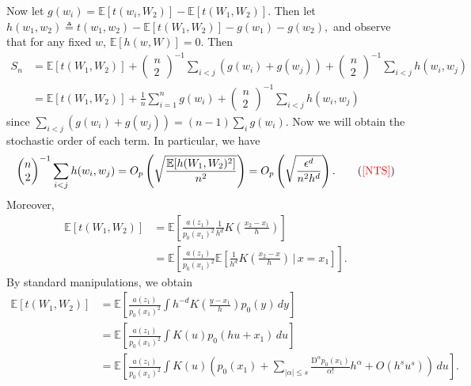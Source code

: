 \documentclass[11pt]{article}
\newcommand{\nts}{{\color{red}[NTS]}}
\begin{document}
Now let $g(w_i) = \mathbb{E}[t(w_i, W_2)] - \mathbb{E}[t(W_1, W_2)]$. Then let $h(w_1, w_2) \triangleq t(w_1, w_2) - \mathbb{E}[t(W_1, W_2)] - g(w_1) - g(w_2), $ and observe that for any fixed $w$, $\mathbb{E}[h(w, W)] = 0.$ Then
\begin{align*}
    S_n &=  \mathbb{E}[t(W_1, W_2)] + \begin{pmatrix}
        n \\
        2
    \end{pmatrix}^{-1}\sum_{i < j} (g(w_i) + g(w_j)) + \begin{pmatrix}
        n \\
        2
    \end{pmatrix}^{-1}\sum_{i < j}h(w_i, w_j) \\
    &= \mathbb{E}[t(W_1, W_2)] + \frac{1}{n}\sum_{i = 1}^n g(w_i) + \begin{pmatrix}
        n \\
        2
    \end{pmatrix}^{-1}\sum_{i < j}h(w_i, w_j)
\end{align*}
since $\sum_{i < j} (g(w_i) + g(w_j)) = (n-1)\sum_{i}g(w_i)$. Now we will obtain the stochastic order of each term. In particular, we have 
\begin{align*}
    \begin{pmatrix}
        n \\
        2
    \end{pmatrix}^{-1}\sum_{i < j}h(w_i, w_j) &= O_p\left(\sqrt{\frac{\mathbb{E}[h(W_1, W_2)^2]}{n^2}}\right) = O_p\left(\sqrt{\frac{\epsilon^d}{n^2h^d}}\right). \tag{\nts} \\
\end{align*}
Moreover,
\begin{align*}
    \mathbb{E}[t(W_1, W_2)] &= \mathbb{E}\left[\frac{a(z_1)}{p_0(x_1)^2}\frac{1}{h^d}K\left(\frac{x_2 - x_1}{h}\right)\right] \\
    &= \mathbb{E}\left[\frac{a(z_1)}{p_0(x_1)^2}\mathbb{E}\left[\frac{1}{h^d}K\left(\frac{x_2 - x}{h}\right)\,\Bigg|\, x = x_1\right]\right].
\end{align*}
By standard manipulations, we obtain 
\begin{align*}
    \mathbb{E}[t(W_1, W_2)] &= \mathbb{E}\left[\frac{a(z_1)}{p_0(x_1)^2}\int h^{-d}K\left(\frac{y - x_1}{h}\right)p_0(y) \,dy\right] \\
    &= \mathbb{E}\left[\frac{a(z_1)}{p_0(x_1)^2}\int K\left(u\right)p_0(hu + x_1) \,du\right] \tag{$u = (y-x_1)/h$} \\
    &= \mathbb{E}\left[\frac{a(z_1)}{p_0(x_1)^2}\int K\left(u\right)\left(p_0(x_1) + \sum_{|\alpha| \leq s}\frac{\text{D}^\alpha p_0(x_1)}{\alpha!}h^\alpha + O(h^su^s)\right) \,du\right].
\end{align*}
\end{document}
